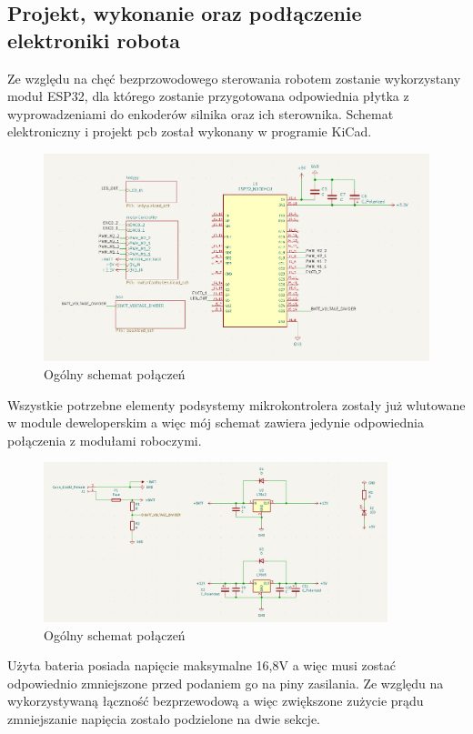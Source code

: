 \subsection{Projekt, wykonanie oraz podłączenie elektroniki robota}
Ze względu na chęć bezprzowodowego sterowania robotem zostanie wykorzystany moduł ESP32, dla którego zostanie przygotowana odpowiednia płytka 
z wyprowadzeniami do enkoderów silnika oraz ich sterownika. Schemat elektroniczny i projekt pcb został wykonany w programie KiCad. 
\begin{figure}[H]
	\centering
	\includegraphics[width=13cm]{pages/robot/zdjecia/kicad/schematCaly.png}
	\caption{Ogólny schemat połączeń}
	\label{Fig:Rysunek}
\end{figure}
Wszystkie potrzebne elementy podsystemy mikrokontrolera zostały już wlutowane w module deweloperskim
a więc mój schemat zawiera jedynie odpowiednia połączenia z modułami roboczymi.
\begin{figure}[H]
	\centering
	\includegraphics[width=10cm]{pages/robot/zdjecia/kicad/schematZasilanie.png}
	\caption{Ogólny schemat połączeń}
	\label{Fig:Rysunek}
\end{figure}
Użyta bateria posiada napięcie maksymalne 16,8V a więc musi zostać odpowiednio zmniejszone przed podaniem go na piny zasilania. 
Ze względu na wykorzystywaną łączność bezprzewodową a więc zwiększone zużycie prądu zmniejszanie napięcia zostało podzielone na dwie sekcje. 
